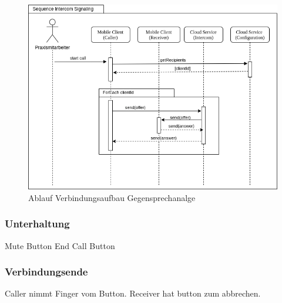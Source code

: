 \begin{figure}[h]
    \centering
    \begin{minipage}[b]{0.9\textwidth}
        \includegraphics[width=\textwidth]{graphics/diagramms/Sequence_Intercom_Broking_V02}
        \caption{Ablauf Verbindungsaufbau Gegensprechanalge}
    \end{minipage}
\end{figure}



\subsubsection*{Unterhaltung}

Mute Button
End Call Button


\subsubsection*{Verbindungsende}

Caller nimmt Finger vom Button.
Receiver hat button zum abbrechen.

\clearpage

